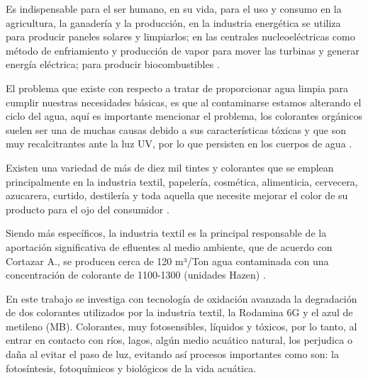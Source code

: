 \documentclass[12pt]{article}
\begin{document}
\vspace{1em} %

Es indispensable para el ser humano, en su vida, para el uso y consumo en la agricultura, la ganadería y la producción, en la industria energética se utiliza para producir paneles solares y limpiarlos; en las centrales nucleoeléctricas como método de enfriamiento y producción de vapor para mover las turbinas y generar energía eléctrica; para producir biocombustibles \cite{IEEEreferencias:Ref4}.
\vspace{1em} %

El problema que existe con respecto a tratar de proporcionar agua limpia para cumplir nuestras necesidades básicas, es que al contaminarse estamos alterando el ciclo del agua, aquí es importante mencionar el problema, los colorantes orgánicos suelen ser una de muchas causas debido a sus características tóxicas y que son muy recalcitrantes ante la luz UV, por lo que persisten en los cuerpos de agua \cite{IEEEreferencias:Ref4}.\vspace{1em} %


Existen una variedad de más de diez mil tintes y colorantes que se emplean principalmente en la industria textil, papelería, cosmética, alimenticia, cervecera, azucarera, curtido, destilería y toda aquella que necesite mejorar el color de su producto para el ojo del consumidor \cite{IEEEreferencias:Ref3}. 
\vspace{1em} %

Siendo más específicos, la industria textil es la principal responsable de la aportación significativa de efluentes al medio ambiente, que de acuerdo con Cortazar A., se producen cerca de 120 m³/Ton agua contaminada con una concentración de colorante de 1100-1300 (unidades Hazen) \cite{IEEEreferencias:Ref4}.
\vspace{1em} %

En este trabajo se investiga con tecnología de oxidación avanzada la degradación de dos colorantes utilizados por la industria textil, la Rodamina 6G y el azul de metileno (MB). Colorantes, muy fotosensibles, líquidos y tóxicos, por lo tanto, al entrar en contacto con ríos, lagos, algún medio acuático natural, los perjudica o daña al evitar el paso de luz, evitando así procesos importantes como son: la fotosíntesis, fotoquímicos y biológicos de la vida acuática\cite{IEEEreferencias:Ref6}.
\vspace{1em} %
\end{document}
